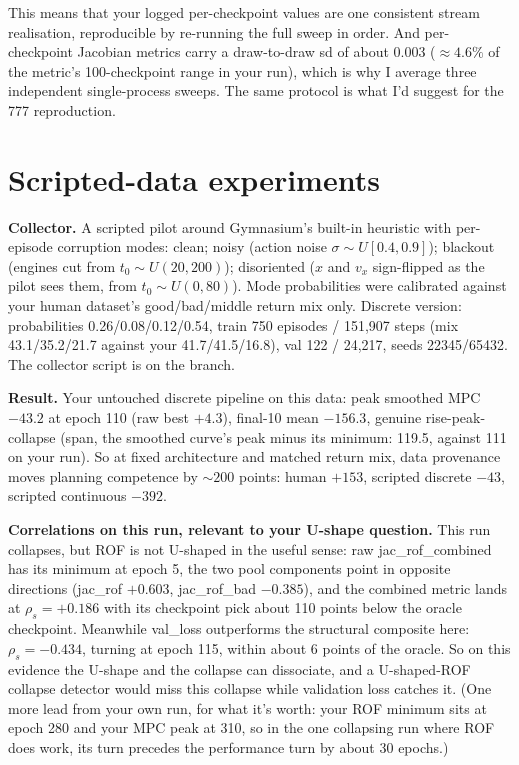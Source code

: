 \documentclass[11pt]{article}
\begin{document}
This means that your logged per-checkpoint values are one
consistent stream realisation, reproducible by re-running the full
sweep in order. And per-checkpoint Jacobian metrics carry a draw-to-draw
sd of about 0.003 (\(\approx 4.6\%\) of the metric's 100-checkpoint
range in your run), which is why I average three independent
single-process sweeps. The same protocol is what I'd suggest for the 777
reproduction.

\section{Scripted-data experiments}\label{scripted-data-experiments}

\textbf{Collector.} A scripted pilot around Gymnasium's built-in
heuristic with per-episode corruption modes: clean; noisy (action noise
\(\sigma \sim U[0.4, 0.9]\)); blackout (engines cut from
\(t_0 \sim U(20, 200)\)); disoriented (\(x\) and \(v_x\) sign-flipped as
the pilot sees them, from \(t_0 \sim U(0, 80)\)). Mode probabilities
were calibrated against your human dataset's good/bad/middle return mix
only. Discrete version: probabilities 0.26/0.08/0.12/0.54, train 750
episodes / 151,907 steps (mix 43.1/35.2/21.7 against your
41.7/41.5/16.8), val 122 / 24,217, seeds 22345/65432. The collector
script is on the branch.

\textbf{Result.} Your untouched discrete pipeline on this data: peak
smoothed MPC \(-43.2\) at epoch 110 (raw best \(+4.3\)), final-10 mean
\(-156.3\), genuine rise-peak-collapse (span, the smoothed curve's peak
minus its minimum: 119.5, against 111 on your run). So at fixed architecture and matched return mix, data
provenance moves planning competence by \(\sim 200\) points: human
\(+153\), scripted discrete \(-43\), scripted continuous \(-392\).

\textbf{Correlations on this run, relevant to your U-shape question.}
This run collapses, but ROF is not U-shaped in the useful sense: raw
jac\_rof\_combined has its minimum at epoch 5, the two pool components
point in opposite directions (jac\_rof \(+0.603\), jac\_rof\_bad
\(-0.385\)), and the combined metric lands at \(\rho_s = +0.186\) with
its checkpoint pick about 110 points below the oracle checkpoint.
Meanwhile val\_loss outperforms the structural composite here:
\(\rho_s = -0.434\), turning at epoch 115, within about 6 points of the
oracle. So on this evidence the U-shape and the collapse can
dissociate, and a U-shaped-ROF collapse detector would miss this
collapse while validation loss catches it. (One more lead from your own
run, for what it's worth: your ROF minimum sits at epoch 280 and your
MPC peak at 310, so in the one collapsing run where ROF does work, its
turn precedes the performance turn by about 30 epochs.)
\end{document}
